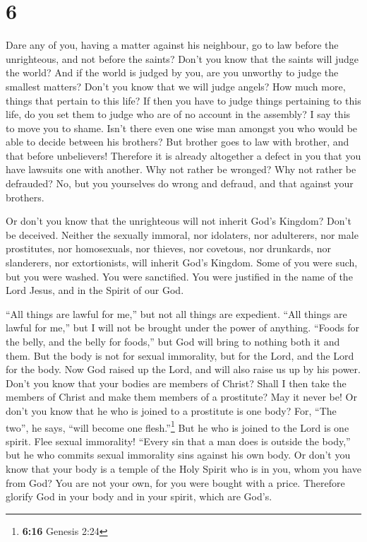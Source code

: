\hypertarget{section-5}{%
\section{6}\label{section-5}}

 Dare any of you, having a matter against his neighbour,
go to law before the unrighteous, and not before the saints?
 Don't you know that the saints will judge the world? And
if the world is judged by you, are you unworthy to judge the smallest
matters?  Don't you know that we will judge angels? How
much more, things that pertain to this life?  If then you
have to judge things pertaining to this life, do you set them to judge
who are of no account in the assembly?  I say this to move
you to shame. Isn't there even one wise man amongst you who would be
able to decide between his brothers?  But brother goes to
law with brother, and that before unbelievers!  Therefore
it is already altogether a defect in you that you have lawsuits one with
another. Why not rather be wronged? Why not rather be defrauded?
 No, but you yourselves do wrong and defraud, and that
against your brothers.

 Or don't you know that the unrighteous will not inherit
God's Kingdom? Don't be deceived. Neither the sexually immoral, nor
idolaters, nor adulterers, nor male prostitutes, nor homosexuals,
 nor thieves, nor covetous, nor drunkards, nor
slanderers, nor extortionists, will inherit God's Kingdom.
 Some of you were such, but you were washed. You were
sanctified. You were justified in the name of the Lord Jesus, and in the
Spirit of our God.

 ``All things are lawful for me,'' but not all things are
expedient. ``All things are lawful for me,'' but I will not be brought
under the power of anything.  ``Foods for the belly, and
the belly for foods,'' but God will bring to nothing both it and them.
But the body is not for sexual immorality, but for the Lord, and the
Lord for the body.  Now God raised up the Lord, and will
also raise us up by his power.  Don't you know that your
bodies are members of Christ? Shall I then take the members of Christ
and make them members of a prostitute? May it never be! 
Or don't you know that he who is joined to a prostitute is one body?
For, ``The two'', he says, ``will become one flesh.''\footnote{\textbf{6:16}
  Genesis 2:24}  But he who is joined to the Lord is one
spirit.  Flee sexual immorality! ``Every sin that a man
does is outside the body,'' but he who commits sexual immorality sins
against his own body.  Or don't you know that your body
is a temple of the Holy Spirit who is in you, whom you have from God?
You are not your own,  for you were bought with a price.
Therefore glorify God in your body and in your spirit, which are God's.

